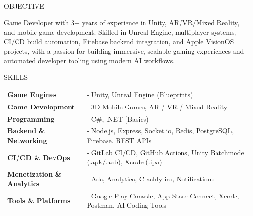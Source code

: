 \documentclass{resume} %
\begin{document}

\begin{rSection}{OBJECTIVE}

{Game Developer with 3+ years of experience in Unity, AR/VR/Mixed Reality, and mobile game development. Skilled in Unreal Engine, multiplayer systems, CI/CD build automation, Firebase backend integration, and Apple VisionOS projects, with a passion for building immersive, scalable gaming experiences and automated developer tooling using modern AI workflows.}

\end{rSection}


\begin{rSection}{SKILLS}

\renewcommand{\arraystretch}{1.25}
\begin{tabular}{ @{} >{\bfseries}l @{\hspace{3.5ex}} l }
Game Engines & - Unity, Unreal Engine (Blueprints) \\
Game Development & - 3D Mobile Games, AR / VR / Mixed Reality \\
Programming & - C\#, .NET (Basics) \\
Backend \& Networking & - Node.js, Express, Socket.io, Redis, PostgreSQL, Firebase, REST APIs \\
CI/CD \& DevOps & - GitLab CI/CD, GitHub Actions, Unity Batchmode (.apk/.aab), Xcode (.ipa) \\
Monetization \& Analytics & - Ads, Analytics, Crashlytics, Notifications \\
Tools \& Platforms & - Google Play Console, App Store Connect, Xcode, Postman, AI Coding Tools
\end{tabular}

\end{rSection}

\end{document}
